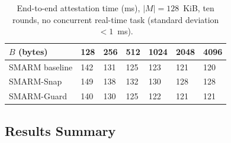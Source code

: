 \documentclass[conference]{IEEEtran}
\newcommand{\tdis}{$t_{\mathrm{disabled}}$\xspace}
\newcommand{\smarmcopy}{SMARM-Snap\xspace}
\newcommand{\smarmlock}{SMARM-Guard\xspace}
\begin{document}
\begin{table}[!ht]
  \centering
    \caption{End-to-end attestation time (ms), $|M|{=}128$~KiB,
    ten rounds, no concurrent real-time task
    (standard deviation $<1$~ms).}
  \label{tab:attest_runtime}
  \small
  \setlength{\tabcolsep}{3.5pt}
  \begin{tabularx}{\columnwidth}{@{}lXXXXXX@{}}
    \toprule
    \textbf{$B$ (bytes)} & 128 & 256 & 512 & 1024 & 2048 & 4096 \\
    \midrule
    SMARM baseline  & 142 & 131 & 125 & 123 & 121 & 120 \\
    \smarmcopy  & 149 & 138 & 132 & 130 & 128 & 128 \\
    \smarmlock & 140 & 130 & 125 & 122 & 121 & 121 \\
    \bottomrule
  \end{tabularx}
\end{table}


\subsection{Results Summary}
\label{sec:guidance}



\end{document}
